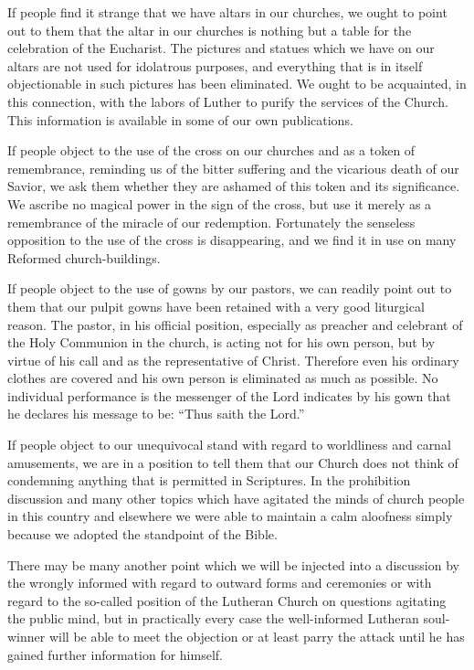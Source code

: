 \documentclass[
]{book}
\begin{document}
If people find it strange that we have altars in our churches, we ought to point out to them that the altar in our churches is nothing but a table for the celebration of the Eucharist. The pictures and statues which we have on our altars are not used for idolatrous purposes, and everything that is in itself objectionable in such pictures has been eliminated. We ought to be acquainted, in this connection, with the labors of Luther to purify the services of the Church. This information is available in some of our own publications.

If people object to the use of the cross on our churches and as a token of remembrance, reminding us of the bitter suffering and the vicarious death of our Savior, we ask them whether they are ashamed of this token and its significance. We ascribe no magical power in the sign of the cross, but use it merely as a remembrance of the miracle of our redemption. Fortunately the senseless opposition to the use of the cross is disappearing, and we find it in use on many Reformed church-buildings.

If people object to the use of gowns by our pastors, we can readily point out to them that our pulpit gowns have been retained with a very good liturgical reason. The pastor, in his official position, especially as preacher and celebrant of the Holy Communion in the church, is acting not for his own person, but by virtue of his call and as the representative of Christ. Therefore even his ordinary clothes are covered and his own person is eliminated as much as possible. No individual performance is the messenger of the Lord indicates by his gown that he declares his message to be: ``Thus saith the Lord.''

If people object to our unequivocal stand with regard to worldliness and carnal amusements, we are in a position to tell them that our Church does not think of condemning anything that is permitted in Scriptures. In the prohibition discussion and many other topics which have agitated the minds of church people in this country and elsewhere we were able to maintain a calm aloofness simply because we adopted the standpoint of the Bible.

There may be many another point which we will be injected into a discussion by the wrongly informed with regard to outward forms and ceremonies or with regard to the so-called position of the Lutheran Church on questions agitating the public mind, but in practically every case the well-informed Lutheran soul-winner will be able to meet the objection or at least parry the attack until he has gained further information for himself.
\end{document}
